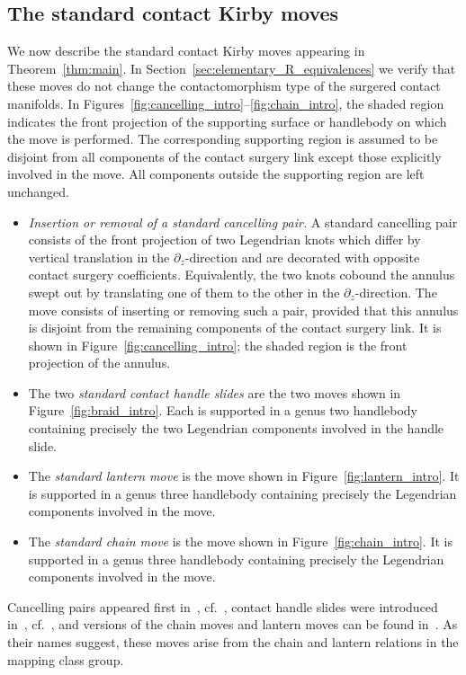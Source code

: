 \documentclass{amsart}
\numberwithin{equation}{section}
\numberwithin{figure}{section}
\theoremstyle{definition}
\theoremstyle{remark}
\begin{document}
\subsection{The standard contact Kirby moves}
We now describe the standard contact Kirby moves appearing in Theorem~\ref{thm:main}. In Section~\ref{sec:elementary_R_equivalences} we verify that these moves do not change the contactomorphism type of the surgered contact manifolds. In Figures~\ref{fig:cancelling_intro}--\ref{fig:chain_intro}, the shaded region indicates the front projection of the supporting surface or handlebody on which the move is performed. The corresponding supporting region is assumed to be disjoint from all components of the contact surgery link except those explicitly involved in the move. All components outside the supporting region are left unchanged.
\begin{itemize}
    \item \emph{Insertion or removal of a standard cancelling pair.} A standard cancelling pair consists of the front projection of two Legendrian knots which differ by vertical translation in the $\partial_z$-direction and are decorated with opposite contact surgery coefficients. Equivalently, the two knots cobound the annulus swept out by translating one of them to the other in the $\partial_z$-direction. The move consists of inserting or removing such a pair, provided that this annulus is disjoint from the remaining components of the contact surgery link. It is shown in Figure~\ref{fig:cancelling_intro}; the shaded region is the front projection of the annulus. 
    \item The two \emph{standard contact handle slides} are the two moves shown in Figure~\ref{fig:braid_intro}. Each is supported in a genus two handlebody containing precisely the two Legendrian components involved in the handle slide.
    \item The \emph{standard lantern move} is the move shown in Figure~\ref{fig:lantern_intro}. It is supported in a genus three handlebody containing precisely the Legendrian components involved in the move.
    \item The \emph{standard chain move} is the move shown in Figure~\ref{fig:chain_intro}. It is supported in a genus three handlebody containing precisely the Legendrian components involved in the move.
\end{itemize}

Cancelling pairs appeared first in~\cite{Ding_Geiges_fillable}, cf.~\cite{Ding_Geiges_Stipsicz}, contact handle slides were introduced in~\cite{Ding_Geiges_slides}, cf.~\cite{Avdek_surgery,Casals_Etnyre_Kegel}, and versions of the chain moves and lantern moves can be found in~\cite{Avdek13}. As their names suggest, these moves arise from the chain and lantern relations in the mapping class group.
\end{document}
